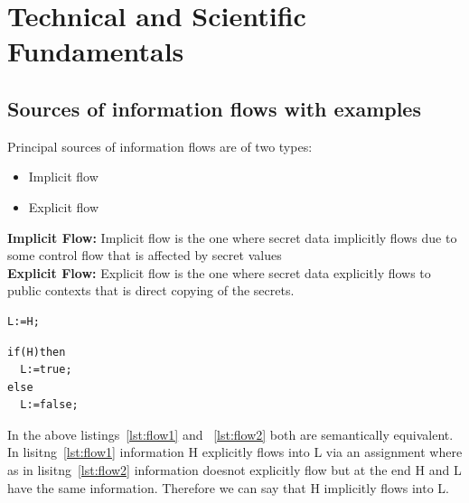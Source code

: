 \chapter{Technical and Scientific Fundamentals}
\label{chapter:Technical}

\section{Sources of information flows with examples}
Principal sources of information flows are of two types:~\cite{King:2008}
~\cite{book:analysis}
\begin{itemize}
 \item Implicit flow
 \item Explicit flow
\end{itemize}
\textbf{Implicit Flow:}
Implicit flow is the one where secret data implicitly flows due
to some control flow that is affected by secret values\\
\textbf{Explicit Flow:}
Explicit flow is the one where secret data explicitly flows to
public contexts that is direct copying of the secrets.\\

\begin{lstlisting}[caption={Explicit Information Flow},label={lst:flow1}]
L:=H;
\end{lstlisting}

\begin{lstlisting}[caption={Implicit Information Flow},label={lst:flow2}]
if(H)then
  L:=true;
else
  L:=false;
\end{lstlisting}

In the above listings~\ref{lst:flow1} and ~\ref{lst:flow2} both are 
semantically equivalent. In lisitng~\ref{lst:flow1} information H explicitly
flows into L via an assignment where as in lisitng~\ref{lst:flow2} information
doesnot explicitly flow but at the end H and L have the same information.
Therefore we can say that H implicitly flows into L.

